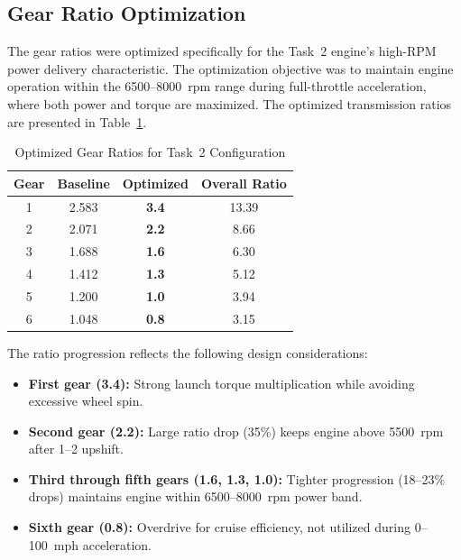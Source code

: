\subsection{Gear Ratio Optimization}

The gear ratios were optimized specifically for the Task~2 engine's high-RPM power delivery characteristic. The optimization objective was to maintain engine operation within the 6500--8000~rpm range during full-throttle acceleration, where both power and torque are maximized. The optimized transmission ratios are presented in Table~\ref{tab:task2_gear_ratios}.

\begin{table}[H]
\centering
\caption{Optimized Gear Ratios for Task~2 Configuration}
\label{tab:task2_gear_ratios}
\small
\begin{tabular}{@{}cccc@{}}
\toprule
\textbf{Gear} & \textbf{Baseline} & \textbf{Optimized} & \textbf{Overall Ratio} \\
\midrule
1 & 2.583 & \textcolor{optimizedcolor}{\textbf{3.4}} & 13.39 \\
2 & 2.071 & \textcolor{optimizedcolor}{\textbf{2.2}} & 8.66 \\
3 & 1.688 & \textcolor{optimizedcolor}{\textbf{1.6}} & 6.30 \\
4 & 1.412 & \textcolor{optimizedcolor}{\textbf{1.3}} & 5.12 \\
5 & 1.200 & \textcolor{optimizedcolor}{\textbf{1.0}} & 3.94 \\
6 & 1.048 & \textcolor{optimizedcolor}{\textbf{0.8}} & 3.15 \\
\bottomrule
\end{tabular}
\end{table}

The ratio progression reflects the following design considerations:

\begin{itemize}
    \item \textbf{First gear (3.4):} Strong launch torque multiplication while avoiding excessive wheel spin.
    \item \textbf{Second gear (2.2):} Large ratio drop (35\%) keeps engine above 5500~rpm after 1--2 upshift.
    \item \textbf{Third through fifth gears (1.6, 1.3, 1.0):} Tighter progression (18--23\% drops) maintains engine within 6500--8000~rpm power band.
    \item \textbf{Sixth gear (0.8):} Overdrive for cruise efficiency, not utilized during 0--100~mph acceleration.
\end{itemize}


